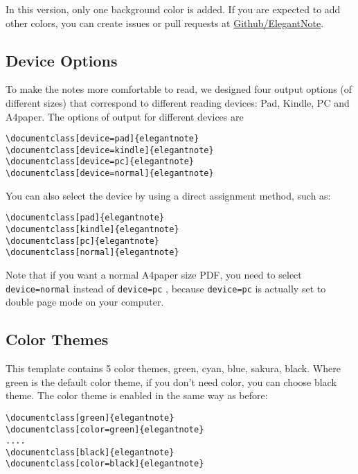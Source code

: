 \documentclass[en,geye,green,screen,14pt]{elegantnote}
\begin{document}
\begin{remark}
In this version, only one background color is added. If you are expected to add other colors, you can create issues or pull requests at \href{https://github.com/ElegantLaTeX/ElegantNote}{Github/ElegantNote}.
\end{remark}

\subsection{Device Options}

To make the notes more comfortable to read, we designed four output options (of different sizes) that correspond to different reading devices: Pad, Kindle, PC and A4paper. The options of output for different devices are
\begin{lstlisting}[frame=none]  
\documentclass[device=pad]{elegantnote}
\documentclass[device=kindle]{elegantnote}
\documentclass[device=pc]{elegantnote}
\documentclass[device=normal]{elegantnote}
\end{lstlisting}
\begin{note}
You can also select the device by using a direct assignment method, such as:
\end{note}
\begin{lstlisting}[frame=none]  
\documentclass[pad]{elegantnote}
\documentclass[kindle]{elegantnote}
\documentclass[pc]{elegantnote}
\documentclass[normal]{elegantnote}
\end{lstlisting}

\begin{note}
Note that if you want a normal A4paper size PDF, you need to select \lstinline{device=normal} instead of \lstinline{device=pc} , because \lstinline{device=pc} is actually set to double page mode on your computer.
\end{note}
\subsection{Color Themes}
This template contains 5 color themes, \textcolor{egreen}{green}, \textcolor{ecyan}{cyan}, \textcolor{eblue}{blue}, \textcolor{sakura}{sakura}, \textcolor{black}{black}. Where green is the default color theme, if you don't need color, you can choose black theme. The color theme is enabled in the same way as before:
\begin{lstlisting}[frame=none]  
\documentclass[green]{elegantnote}
\documentclass[color=green]{elegantnote}
....
\documentclass[black]{elegantnote}
\documentclass[color=black]{elegantnote}
\end{lstlisting}
\end{document}
